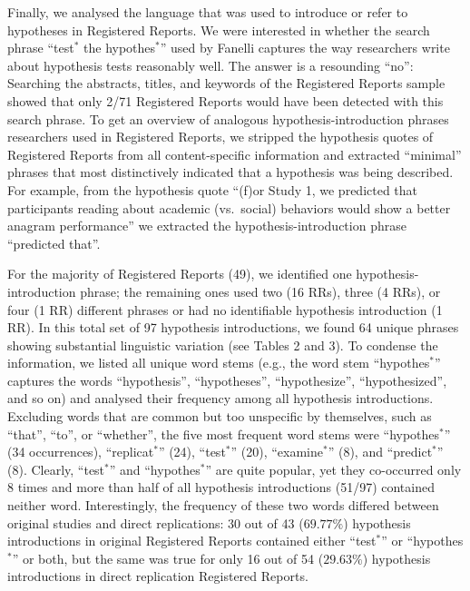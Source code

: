 \documentclass[british,,jou,floatsintext]{apa6}
\begin{document}
Finally, we analysed the language that was used to introduce or refer to hypotheses in Registered Reports.
We were interested in whether the search phrase \enquote{test\(^\ast\) the hypothes\(^\ast\)} used by Fanelli captures the way researchers write about hypothesis tests reasonably well. The answer is a resounding \enquote{no}:
Searching the abstracts, titles, and keywords of the Registered Reports sample showed that only 2/71 Registered Reports would have been detected with this search phrase.
To get an overview of analogous hypothesis-introduction phrases researchers used in Registered Reports, we stripped the hypothesis quotes of Registered Reports from all content-specific information and extracted \enquote{minimal} phrases that most distinctively indicated that a hypothesis was being described.
For example, from the hypothesis quote \enquote{(f)or Study 1, we predicted that participants reading about academic (vs.~social) behaviors would show a better anagram performance} we extracted the hypothesis-introduction phrase \enquote{predicted that}.

For the majority of Registered Reports (49), we identified one hypothesis-introduction phrase; the remaining ones used two (16 RRs), three (4 RRs), or four (1 RR) different phrases or had no identifiable hypothesis introduction (1 RR).
In this total set of 97 hypothesis introductions, we found 64 unique phrases showing substantial linguistic variation (see Tables 2 and 3).
To condense the information, we listed all unique word stems (e.g., the word stem \enquote{hypothes\(^\ast\)} captures the words \enquote{hypothesis}, \enquote{hypotheses}, \enquote{hypothesize}, \enquote{hypothesized}, and so on) and analysed their frequency among all hypothesis introductions.
Excluding words that are common but too unspecific by themselves, such as \enquote{that}, \enquote{to}, or \enquote{whether}, the five most frequent word stems were \enquote{hypothes\(^\ast\)} (34 occurrences), \enquote{replicat\(^\ast\)} (24), \enquote{test\(^\ast\)} (20), \enquote{examine\(^\ast\)} (8), and \enquote{predict\(^\ast\)} (8).
Clearly, \enquote{test\(^\ast\)} and \enquote{hypothes\(^\ast\)} are quite popular, yet they co-occurred only 8 times and more than half of all hypothesis introductions (51/97) contained neither word. Interestingly, the frequency of these two words differed between original studies and direct replications: 30 out of 43 (\(69.77\%\)) hypothesis introductions in original Registered Reports contained either \enquote{test\(^\ast\)} or \enquote{hypothes\(^\ast\)} or both, but the same was true for only 16 out of 54 (\(29.63\%\)) hypothesis introductions in direct replication Registered Reports.
\end{document}
